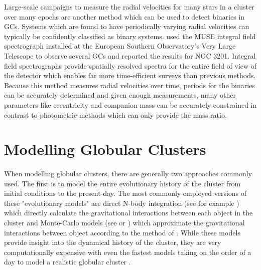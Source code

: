 Large-scale campaigns to measure the radial velocities for many stars in a cluster over many epochs
are another method which can be used to detect binaries in GCs. Systems which are found to have
periodically varying radial velocities can typically be confidently classified as binary systems.
\citet{Giesers2019} used the MUSE integral field spectrograph installed at the European Southern
Observatory's Very Large Telescope to observe several GCs and reported the results for NGC 3201.
Integral field spectrographs provide spatially resolved spectra for the entire field of view of the
detector which enables far more time-efficient surveys than previous methods. Because this method
measures radial velocities over time, periods for the binaries can be accurately determined and
given enough measurements, many other parameters like eccentricity and companion mass can be
accurately constrained in contrast to photometric methods which can only provide the mass ratio.



\section{Modelling Globular Clusters}

\paragraph{}


When modelling globular clusters, there are generally two approaches commonly used. The first is to
model the entire evolutionary history of the cluster from initial conditions to the present-day. The
most commonly employed versions of these "evolutionary models" are direct N-body integration (see
for example \citet{Baumgardt2017a}) which directly calculate the gravitational interactions between
each object in the cluster and Monte-Carlo models (see \citet{Rodriguez2021} or \cite{Hypki2013})
which approximate the gravitational interactions between object according to the method of
\citet{Henon1971}. While these models provide insight into the dynamical history of the cluster,
they are very computationally expensive with even the fastest models taking on the order of a day to
model a realistic globular cluster \citep{Rodriguez2021}.

